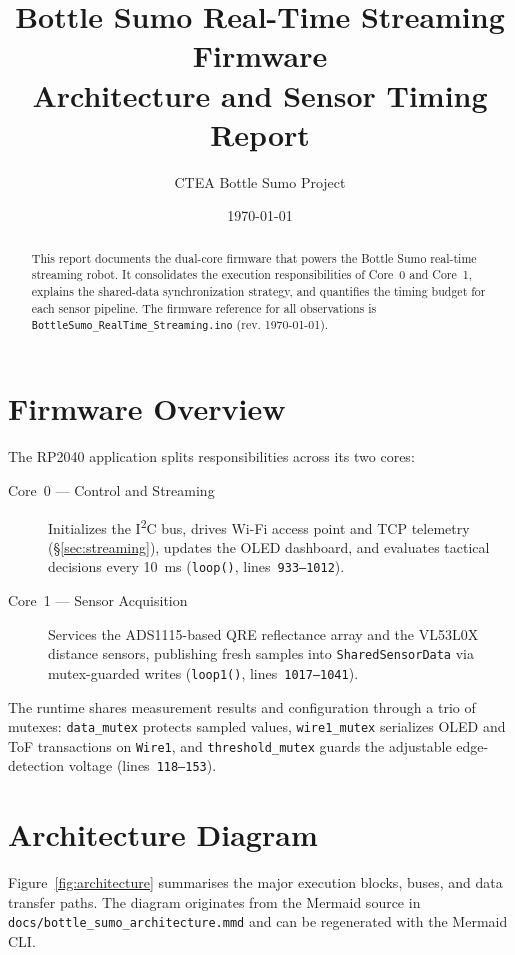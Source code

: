 \documentclass[11pt]{article}
\title{Bottle Sumo Real-Time Streaming Firmware\\Architecture and Sensor Timing Report}
\author{CTEA Bottle Sumo Project}
\date{\today}
\begin{document}
\maketitle

\begin{abstract}
This report documents the dual-core firmware that powers the Bottle Sumo real-time streaming robot. It consolidates the execution responsibilities of Core~0 and Core~1, explains the shared-data synchronization strategy, and quantifies the timing budget for each sensor pipeline. The firmware reference for all observations is \texttt{BottleSumo\_RealTime\_Streaming.ino} (rev. \today).
\end{abstract}

\section{Firmware Overview}
The RP2040 application splits responsibilities across its two cores:
\begin{description}
  \item[Core~0 --- Control and Streaming] Initializes the I\textsuperscript{2}C bus, drives Wi-Fi access point and TCP telemetry (\S\ref{sec:streaming}), updates the OLED dashboard, and evaluates tactical decisions every \SI{10}{\milli\second} (\texttt{loop()}, lines~\texttt{933--1012}).
  \item[Core~1 --- Sensor Acquisition] Services the ADS1115-based QRE reflectance array and the VL53L0X distance sensors, publishing fresh samples into \texttt{SharedSensorData} via mutex-guarded writes (\texttt{loop1()}, lines~\texttt{1017--1041}).
\end{description}

The runtime shares measurement results and configuration through a trio of mutexes: \texttt{data\_mutex} protects sampled values, \texttt{wire1\_mutex} serializes OLED and ToF transactions on \texttt{Wire1}, and \texttt{threshold\_mutex} guards the adjustable edge-detection voltage (lines~\texttt{118--153}).

\section{Architecture Diagram}
Figure~\ref{fig:architecture} summarises the major execution blocks, buses, and data transfer paths. The diagram originates from the Mermaid source in \texttt{docs/bottle\_sumo\_architecture.mmd} and can be regenerated with the Mermaid CLI.
\end{document}
